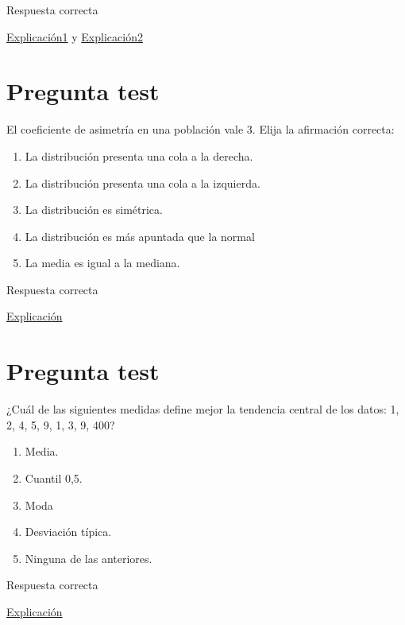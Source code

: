 \documentclass[
]{book}
\providecommand{\tightlist}{%
  \setlength{\itemsep}{0pt}\setlength{\parskip}{0pt}}
\begin{document}
Respuesta correcta

\href{https://1fjmanzano.github.io/bioestadistica/medidas-de-forma.html}{Explicación1} y \href{https://www.statisticshowto.com/what-is-a-bimodal-distribution/}{Explicación2}

\hypertarget{pregunta-test-82}{%
\section{Pregunta test}\label{pregunta-test-82}}

El coeficiente de asimetría en una población vale 3. Elija la afirmación correcta:

\begin{enumerate}
\def\labelenumi{\alph{enumi})}
\tightlist
\item
  La distribución presenta una cola a la derecha.
\item
  La distribución presenta una cola a la izquierda.
\item
  La distribución es simétrica.
\item
  La distribución es más apuntada que la normal
\item
  La media es igual a la mediana.
\end{enumerate}

Respuesta correcta

\href{https://1fjmanzano.github.io/bioestadistica/medidas-de-forma.html}{Explicación}

\hypertarget{pregunta-test-83}{%
\section{Pregunta test}\label{pregunta-test-83}}

¿Cuál de las siguientes medidas define mejor la tendencia central de los datos: 1, 2, 4, 5, 9, 1, 3, 9, 400?

\begin{enumerate}
\def\labelenumi{\alph{enumi})}
\tightlist
\item
  Media.
\item
  Cuantil 0,5.
\item
  Moda
\item
  Desviación típica.
\item
  Ninguna de las anteriores.
\end{enumerate}

Respuesta correcta

\href{https://1fjmanzano.github.io/bioestadistica/medidas-de-posicio\%CC\%81n-dispersio\%CC\%81n-y-forma.html\#medidas-de-posicio\%CC\%81n-no-centrales}{Explicación}
\end{document}
